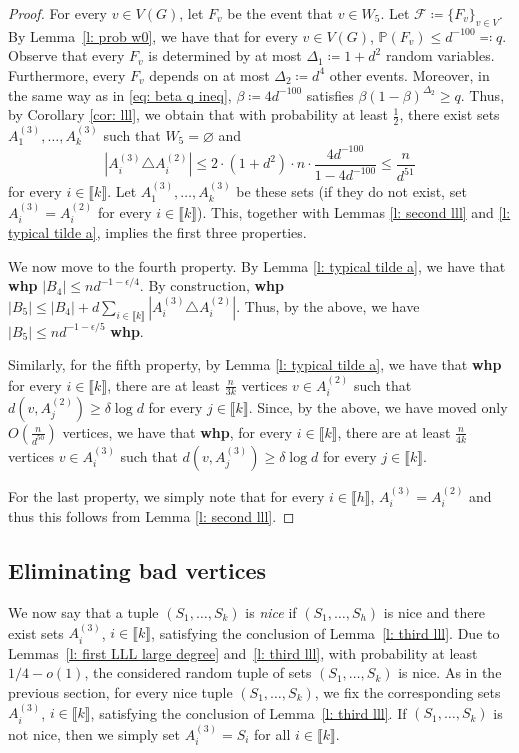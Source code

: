 \documentclass[notitlepage]{scrartcl}
\newcommand{\br}[1]{\llbracket{#1}\rrbracket}
\begin{document}
\begin{proof}
For every $v\in V(G)$, let $F_v$ be the event that $v\in W_5$. Let $\mathcal{F}\coloneqq \{F_v\}_{v\in V}$. By Lemma~\ref{l: prob w0}, we have that for every $v\in V(G)$, $\mathbb{P}\left(F_v\right)\le d^{-100}\eqqcolon q$. Observe that every $F_v$ is determined by at most $\Delta_1\coloneqq 1+d^2$ random variables. Furthermore, every $F_v$ depends on at most $\Delta_2\coloneqq d^4$ other events. Moreover, in the same way as in \eqref{eq: beta q ineq}, $\beta\coloneqq 4d^{-100}$ satisfies $\beta(1-\beta)^{\Delta_2}\ge q$. Thus, by Corollary \ref{cor: lll}, we obtain that with probability at least $\frac{1}{2}$, there exist sets $A_1^{(3)},\ldots, A_k^{(3)}$ such that $W_5=\varnothing$ and 
$$
\left|A_i^{(3)}\triangle A_i^{(2)}\right|\le 2\cdot (1+d^2)\cdot n\cdot \frac{4d^{-100}}{1-4d^{-100}}\le \frac{n}{d^{51}}
$$ 
for every $i\in \br{k}$. Let $A_1^{(3)},\ldots, A_k^{(3)}$ be these sets (if they do not exist, set $A_i^{(3)}=A_i^{(2)}$ for every $i\in \br{k}$). This, together with Lemmas \ref{l: second lll} and \ref{l: typical tilde a}, implies the first three properties. 

We now move to the fourth property. By Lemma \ref{l: typical tilde a}, we have that \textbf{whp} $|B_4|\le nd^{-1-\epsilon/4}$. By construction, \textbf{whp} $|B_5|\le |B_4|+d\sum_{i\in \br{k}}\left|A_i^{(3)}\triangle A_i^{(2)}\right|$. Thus, by the above, we have $|B_5|\le nd^{-1-\epsilon/5}$ \textbf{whp}. 

Similarly, for the fifth property, by Lemma \ref{l: typical tilde a}, we have that \textbf{whp} for every $i\in \br{k}$, there are at least $\frac{n}{3k}$ vertices $v \in A_i^{(2)}$ such that $d(v,A_j^{(2)})\ge \delta\log d$ for every $j\in \br{k}$. Since, by the above, we have moved only $O\left(\frac{n}{d^{50}}\right)$ vertices, we have that \textbf{whp}, for every $i \in \br{k}$, there are at least $\frac{n}{4k}$ vertices $v \in A_i^{(3)}$ such that $d(v,A_j^{(3)})\ge \delta\log d$ for every $j\in \br{k}$. 

For the last property, we simply note that for every $i\in \br{h}$, $A_i^{(3)}=A_i^{(2)}$ and thus this follows from Lemma \ref{l: second lll}.
\end{proof}

\subsection{Eliminating bad vertices}\label{s: bad vertices}

We now say that a tuple $(S_1,\ldots,S_k)$ is \emph{nice} if $(S_1,\ldots,S_h)$ is nice and there exist sets $A_i^{(3)}$, $i\in \br{k}$, satisfying the conclusion of Lemma~\ref{l: third lll}. Due to Lemmas~\ref{l: first LLL large degree} and~\ref{l: third lll}, with probability at least $1/4-o(1)$, the considered random tuple of sets $(S_1,\ldots,S_k)$ is nice. As in the previous section, for every nice tuple $(S_1,\ldots,S_k)$, we fix the corresponding sets $A_i^{(3)}$, $i\in \br{k}$, satisfying the conclusion of Lemma~\ref{l: third lll}. If $(S_1,\ldots,S_k)$ is not nice, then we simply set $A_i^{(3)}=S_i$ for all $i\in \br{k}$.
\end{document}
